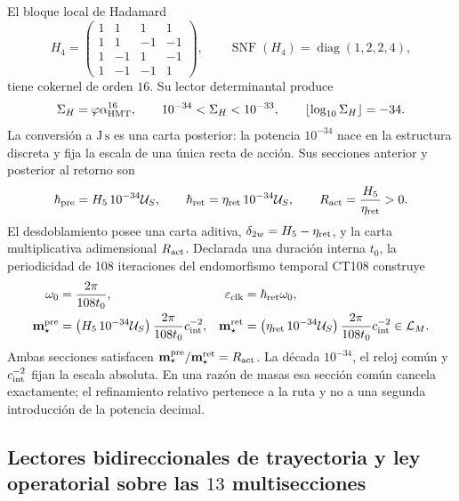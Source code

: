 El bloque local de Hadamard
\[
 H_4=
 \begin{pmatrix}
  1&1&1&1\\
  1&1&-1&-1\\
  1&-1&1&-1\\
  1&-1&-1&1
 \end{pmatrix},
 \qquad
 \operatorname{SNF}(H_4)=\operatorname{diag}(1,2,2,4),
\]
tiene cokernel de orden \(16\). Su lector determinantal produce
\begin{equation}
 \Sigma_H=\varphi\alpha_{\rm HMT}^{16},
 \qquad
 10^{-34}<\Sigma_H<10^{-33},
 \qquad
 \left\lfloor\log_{10}\Sigma_H\right\rfloor=-34.
 \label{eq:orden-menos-34-tabla-masas}
\end{equation}
La conversión a \(\mathrm{J\,s}\) es una carta posterior: la potencia
\(10^{-34}\) nace en la estructura discreta y fija la escala de una única recta
de acción. Sus secciones anterior y posterior al retorno son
\begin{equation}
 \hbar_{\rm pre}=H_5\,10^{-34}\mathcal U_S,\qquad
 \hbar_{\rm ret}=\eta_{\rm ret}\,10^{-34}\mathcal U_S,
 \qquad
 R_{\rm act}=\frac{H_5}{\eta_{\rm ret}}>0.
 \label{eq:accion-absoluta-y-razon-tabla-masas}
\end{equation}
El desdoblamiento posee una carta aditiva,
\(\delta_{2w}=H_5-\eta_{\rm ret}\), y la carta multiplicativa adimensional
\(R_{\rm act}\). Declarada una duración interna \(t_0\), la periodicidad de
108 iteraciones del endomorfismo temporal CT108 construye
\begin{align}
 \omega_0&=\frac{2\pi}{108t_0},
 &\varepsilon_{\rm clk}&=\hbar_{\rm ret}\omega_0,
 \label{eq:cuanto-reloj-masa-rectora}\\
 \mathbf m_\star^{\rm pre}
 &=\left(H_5\,10^{-34}\mathcal U_S\right)
   \frac{2\pi}{108t_0}c_{\rm int}^{-2},
 &\mathbf m_\star^{\rm ret}
 &=\left(\eta_{\rm ret}\,10^{-34}\mathcal U_S\right)
   \frac{2\pi}{108t_0}c_{\rm int}^{-2}\in\mathcal L_M.
 \label{eq:seccion-reloj-masa-rectora}
\end{align}
Ambas secciones satisfacen
\(\mathbf m_\star^{\rm pre}/\mathbf m_\star^{\rm ret}=R_{\rm act}\).
La década \(10^{-34}\), el reloj común y \(c_{\rm int}^{-2}\) fijan la escala
absoluta. En una razón de masas esa sección común cancela exactamente; el
refinamiento relativo pertenece a la ruta y no a una segunda introducción de la
potencia decimal.

\subsection{Lectores bidireccionales de trayectoria y ley operatorial sobre las \(13\) multisecciones}

